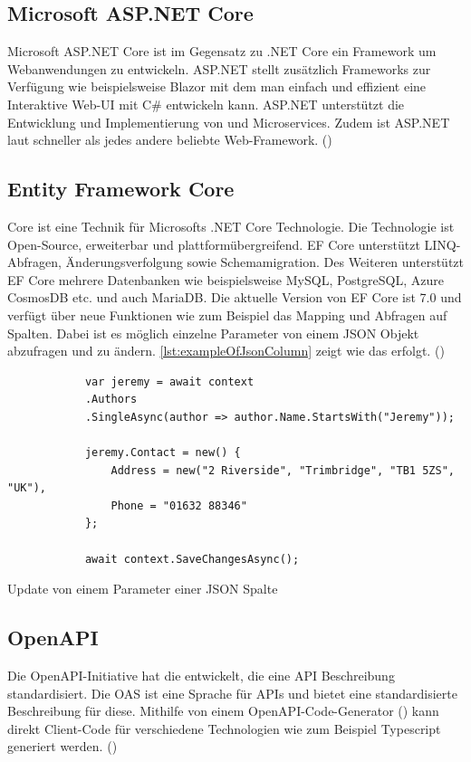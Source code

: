 \documentclass[a4paper, fontsize=11pt, parskip=half, twoside, headings=openright]{scrreprt}
\begin{document}
	\subsection{Microsoft ASP.NET Core}
	Microsoft ASP.NET Core ist im Gegensatz zu .NET Core ein Framework um Webanwendungen zu entwickeln. 
	ASP.NET stellt zusätzlich Frameworks zur Verfügung wie beispielsweise Blazor mit dem man einfach und effizient eine Interaktive Web-\ac{UI} mit C\# entwickeln kann.
	ASP.NET unterstützt die Entwicklung und Implementierung von  und Microservices.
	Zudem ist ASP.NET laut \textcite{noauthor_techempower_nodate} schneller als jedes andere beliebte Web-Framework. (\textcite{billwagner_net_nodate})
	
	\subsection{Entity Framework Core}
	 Core ist eine  Technik für Microsofts .NET Core Technologie. 
	Die Technologie ist Open-Source, erweiterbar und plattformübergreifend.
	\ac{EF} Core unterstützt LINQ-Abfragen, Änderungsverfolgung sowie Schemamigration.
	Des Weiteren unterstützt \ac{EF} Core mehrere Datenbanken wie beispielsweise MySQL, PostgreSQL, Azure CosmosDB etc. und auch MariaDB.
	Die aktuelle Version von \ac{EF} Core ist 7.0 und verfügt über neue Funktionen wie zum Beispiel das Mapping und Abfragen auf  Spalten. 
	Dabei ist es möglich einzelne Parameter von einem \ac{JSON} Objekt abzufragen und zu ändern. 
	\autoref{lst:exampleOfJsonColumn} zeigt wie das erfolgt. (\textcite{billwagner_net_nodate})
	
	\begin{listing}[ht]
		\begin{verbatim}
			var jeremy = await context
			.Authors
			.SingleAsync(author => author.Name.StartsWith("Jeremy"));
			
			jeremy.Contact = new() { 
				Address = new("2 Riverside", "Trimbridge", "TB1 5ZS", "UK"), 
				Phone = "01632 88346" 
			};
		
			await context.SaveChangesAsync();
		\end{verbatim}
		\caption{Update von einem Parameter einer \ac{JSON} Spalte}
		\label{lst:exampleOfJsonColumn}
	\end{listing}
	
	\subsection{OpenAPI}
	Die OpenAPI-Initiative hat die  entwickelt, die eine \ac{API} Beschreibung standardisiert.
	Die \ac{OAS} ist eine Sprache für  \ac{API}s und bietet eine standardisierte Beschreibung für diese.
	Mithilfe von einem OpenAPI-Code-Generator (\textcite{noauthor_openapi_nodate-1}) kann direkt Client-Code für verschiedene Technologien wie zum Beispiel Typescript generiert werden. (\textcite{noauthor_openapi_nodate})
	
\end{document}

